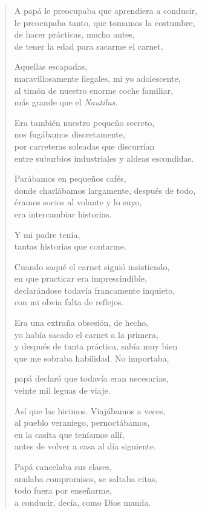\begin{verse}
A papá le preocupaba que aprendiera a conducir,\\
le preocupaba tanto, que tomamos la costumbre,\\
de hacer prácticas, mucho antes,\\
de tener la edad para sacarme el carnet.

Aquellas escapadas,\\
maravillosamente ilegales, mi yo adolescente,\\
al timón de nuestro enorme coche familiar,\\
más grande que el \emph{Nautilus}.

Era también nuestro pequeño secreto,\\
nos fugábamos discretamente,\\
por carreteras soleadas que discurrían\\
entre suburbios industriales y aldeas escondidas.

Parábamos en pequeños cafés,\\
donde charlábamos largamente, después de todo,\\
éramos socios al volante y lo suyo,\\
era intercambiar historias.

Y mi padre tenía,\\
tantas historias que contarme.

Cuando saqué el carnet siguió insistiendo,\\
en que practicar era imprescindible,\\
declarándose todavía francamente inquieto,\\
con mi obvia falta de reflejos.

Era una extraña obsesión, de hecho,\\
yo había sacado el carnet a la primera,\\
y después de tanta práctica, sabía muy bien\\
que me sobraba habilidad. No importaba,

papá declaró que todavía eran necesarias,\\
veinte mil leguas de viaje.

Así que las hicimos. Viajábamos a veces,\\
al pueblo veraniego, pernoctábamos,\\
en la casita que teníamos allí,\\
antes de volver a casa al día siguiente.

Papá cancelaba sus clases,\\
anulaba compromisos, se saltaba citas,\\
todo fuera por enseñarme,\\
a conducir, decía, como Dios manda.


\end{verse}
